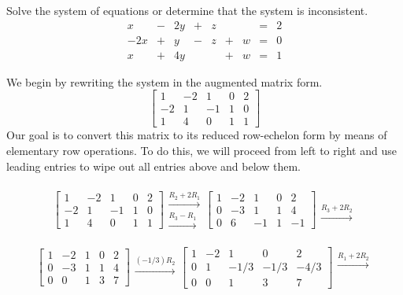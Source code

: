\documentclass{ximera}
\begin{document}
\begin{example}\label{ex:freevar1} Solve the system of equations or determine that the system is inconsistent.
$$\begin{array}{ccccccccc}
      x &- &2y&+&z&&&= &2 \\
	 -2x& +&y&-&z&+&w&=&0\\
     x& +&4y&&&+&w&=&1 
    \end{array}$$
\begin{explanation}
We begin by rewriting the system in the augmented matrix form.
$$\left[\begin{array}{cccc|c}  
 1&-2&1&0&2\\-2&1&-1&1&0\\1&4&0&1&1
 \end{array}\right]$$
 Our goal is to convert this matrix to its reduced row-echelon form by means of elementary row operations.  To do this, we will proceed from left to right and use leading entries to wipe out all entries above and below them.
 
 $$\left[\begin{array}{cccc|c}  
 1&-2&1&0&2\\-2&1&-1&1&0\\1&4&0&1&1
 \end{array}\right]
 \begin{array}{c}
 \\
 \xrightarrow{R_2+2R_1}\\
\xrightarrow{R_3-R_1}\\
 \end{array}\left[\begin{array}{cccc|c}  
 1&-2&1&0&2\\0&-3&1&1&4\\0&6&-1&1&-1
 \end{array}\right]\begin{array}{c}
 \\
 \\
\xrightarrow{R_3+2R_2}\\
 \end{array}$$
 
 $$\left[\begin{array}{cccc|c}  
 1&-2&1&0&2\\0&-3&1&1&4\\0&0&1&3&7
 \end{array}\right]
 \begin{array}{c}
 \\
 \xrightarrow{(-1/3)R_2}\\
\\
 \end{array}\left[\begin{array}{cccc|c}  
 1&-2&1&0&2\\0&1&-1/3&-1/3&-4/3\\0&0&1&3&7
 \end{array}\right]\begin{array}{c}
 \xrightarrow{R_1+2R_2}\\
 \\
\\
 \end{array}$$
 

\end{explanation}
\end{example}
\end{document}
